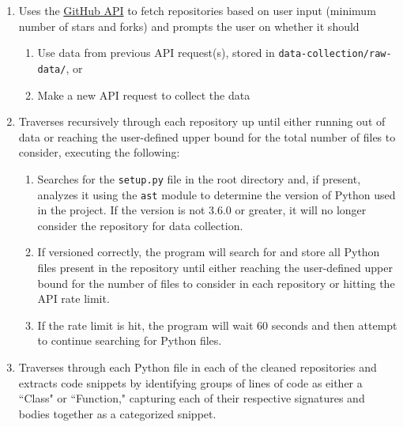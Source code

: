 \documentclass[11pt]{article}
\begin{document}
\begin{enumerate}[label=\alph*.]
    \item Uses the \href{https://docs.github.com/en/rest?apiVersion=2022-11-28}{\color{blue}GitHub API} to fetch repositories based on user input (minimum number of stars and forks) and prompts the user on whether it should
    
    \vspace{-2.5mm}
    
    \begin{enumerate}[label=\roman*.]
        \item Use data from previous API request(s), stored in \texttt{data-collection/raw-data/}, or
        \item Make a new API request to collect the data
    \end{enumerate}

    \vspace{-2.5mm}
    
    \item Traverses recursively through each repository up until either running out of data or reaching the user-defined upper bound for the total number of files to consider, executing the following:

    \vspace{-2.5mm}
    
    \begin{enumerate}[label=\roman*.]
        \item Searches for the \texttt{setup.py} file in the root directory and, if present, analyzes it using the \texttt{ast} module to determine the version of Python used in the project. If the version is not 3.6.0 or greater, it will no longer consider the repository for data collection.
        \item If versioned correctly, the program will search for and store all Python files present in the repository until either reaching the user-defined upper bound for the number of files to consider in each repository or hitting the API rate limit.
        \item If the rate limit is hit, the program will wait 60 seconds and then attempt to continue searching for Python files.
    \end{enumerate}

    \vspace{-2.5mm}

    \item Traverses through each Python file in each of the cleaned repositories and extracts code snippets by identifying groups of lines of code as either a ``Class" or ``Function," capturing each of their respective signatures and bodies together as a categorized snippet.


\end{enumerate}
\end{document}
